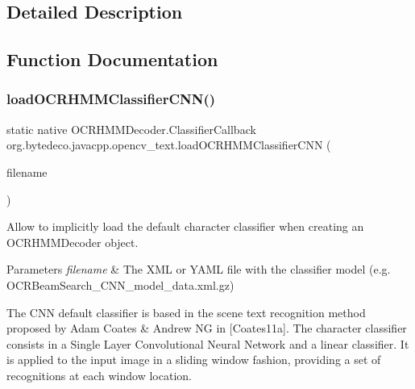 \subsection{Detailed Description}


\subsection{Function Documentation}
\mbox{\label{group__text__recognize_ga03f0450934c0f48a89daa868f8ca9fcf}} 
\subsubsection{\texorpdfstring{load\+O\+C\+R\+H\+M\+M\+Classifier\+C\+N\+N()}{loadOCRHMMClassifierCNN()}}
{\footnotesize\ttfamily static native O\+C\+R\+H\+M\+M\+Decoder.\+Classifier\+Callback org.\+bytedeco.\+javacpp.\+opencv\+\_\+text.\+load\+O\+C\+R\+H\+M\+M\+Classifier\+C\+NN (\begin{DoxyParamCaption}\item[{@Str Byte\+Pointer}]{filename }\end{DoxyParamCaption})\hspace{0.3cm}{\ttfamily [static]}}



Allow to implicitly load the default character classifier when creating an O\+C\+R\+H\+M\+M\+Decoder object. 


\begin{DoxyParams}{Parameters}
{\em filename} & The X\+ML or Y\+A\+ML file with the classifier model (e.\+g. O\+C\+R\+Beam\+Search\+\_\+\+C\+N\+N\+\_\+model\+\_\+data.\+xml.\+gz) \\
\hline
\end{DoxyParams}
The C\+NN default classifier is based in the scene text recognition method proposed by Adam Coates \& Andrew NG in \mbox{[}Coates11a\mbox{]}. The character classifier consists in a Single Layer Convolutional Neural Network and a linear classifier. It is applied to the input image in a sliding window fashion, providing a set of recognitions at each window location. \mbox{\label{group__text__recognize_gabe00747d37f40a190b2970f14cdc4d60}} 
